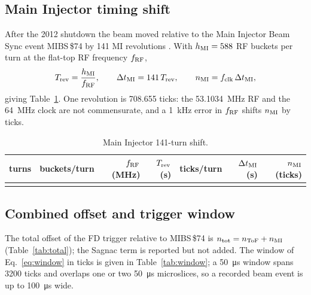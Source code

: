 \documentclass[11pt,letterpaper]{article}
\newcommand{\FD}{FD}
\begin{document}
\begin{table}[htbp]\centering\scriptsize
\caption{Flight times for the surveyed geometry.  ``total'' includes the Main Injector shift of Sec.~\ref{sec:mi}.}
\label{tab:timing}
\end{table}

\subsection{Main Injector timing shift}
\label{sec:mi}
After the 2012 shutdown the beam moved relative to the Main Injector Beam Sync event MIBS\,\$74 by 141 MI revolutions \cite{norman2013nb}.  With $h_{\rm MI}=588$ RF buckets per turn at the flat-top RF frequency $f_{\rm RF}$,
\begin{equation}
T_{\rm rev}=\frac{h_{\rm MI}}{f_{\rm RF}},\qquad \Delta t_{\rm MI}=141\,T_{\rm rev},\qquad n_{\rm MI}=f_{\rm clk}\,\Delta t_{\rm MI},
\end{equation}
giving Table~\ref{tab:mi}.  One revolution is \num{708.655} ticks: the \SI{53.1034}{MHz} RF and the \SI{64}{MHz} clock are not commensurate, and a \SI{1}{kHz} error in $f_{\rm RF}$ shifts $n_{\rm MI}$ by ticks.

\begin{table}[htbp]\centering\small
\caption{Main Injector 141-turn shift.}
\label{tab:mi}
\begin{tabular}{rrrrrrr}
\toprule
turns & buckets/turn & $f_{\rm RF}$ (MHz) & $T_{\rm rev}$ (\textmu{}s) & ticks/turn & $\Delta t_{\rm MI}$ (\textmu{}s) & $n_{\rm MI}$ (ticks) \\
\midrule
 \\
\bottomrule
\end{tabular}
\end{table}

\subsection{Combined offset and trigger window}
The total offset of the \FD{} trigger relative to MIBS\,\$74 is $n_{\rm tot}=n_{\rm ToF}+n_{\rm MI}$ (Table~\ref{tab:total}); the Sagnac term is reported but not added.  The window of Eq.~\eqref{eq:window} in ticks is given in Table~\ref{tab:window}; a \SI{50}{\micro s} window spans \num{3200} ticks and overlaps one or two \SI{50}{\micro s} microslices, so a recorded beam event is up to \SI{100}{\micro s} wide.
\end{document}
